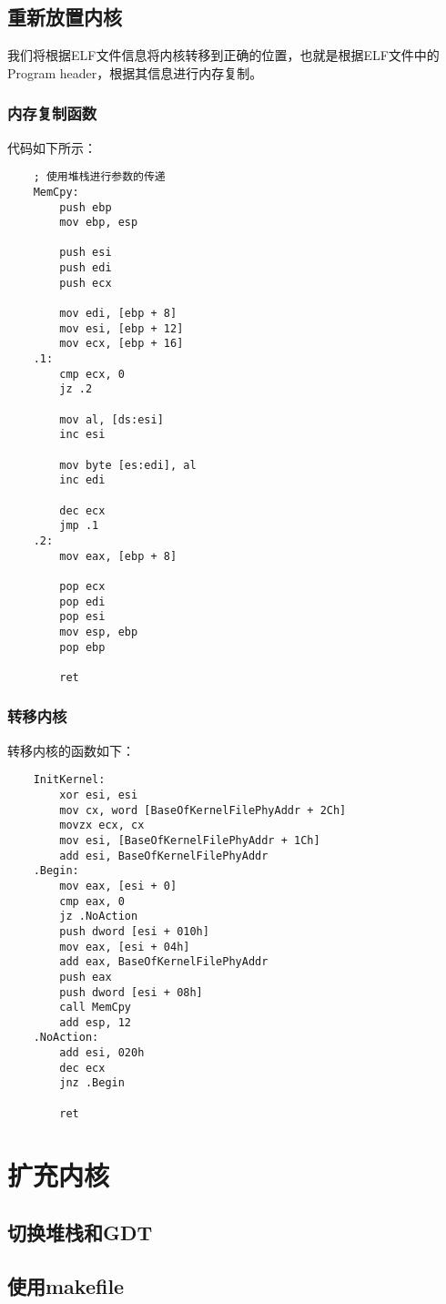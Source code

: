 \documentclass[a4paper,left=2.5cm,right=2.5cm,11pt]{article}
\begin{document}
\subsection{重新放置内核}
	我们将根据ELF文件信息将内核转移到正确的位置，也就是根据ELF文件中的Program header，根据其信息进行内存复制。
	
\subsubsection{内存复制函数}
	代码如下所示：
	\begin{lstlisting}
	; 使用堆栈进行参数的传递
	MemCpy:
		push ebp
		mov ebp, esp

		push esi
		push edi
		push ecx

		mov edi, [ebp + 8]
		mov esi, [ebp + 12]
		mov ecx, [ebp + 16]
	.1:
		cmp ecx, 0
		jz .2

		mov al, [ds:esi]
		inc esi

		mov byte [es:edi], al
		inc edi

		dec ecx
		jmp .1
	.2:
		mov eax, [ebp + 8]

		pop ecx
		pop edi
		pop esi
		mov esp, ebp
		pop ebp

		ret
	\end{lstlisting}

\subsubsection{转移内核}
	转移内核的函数如下：
	\begin{lstlisting}
	InitKernel:
		xor esi, esi
		mov cx, word [BaseOfKernelFilePhyAddr + 2Ch]
		movzx ecx, cx
		mov esi, [BaseOfKernelFilePhyAddr + 1Ch]
		add esi, BaseOfKernelFilePhyAddr
	.Begin:
		mov eax, [esi + 0]
		cmp eax, 0
		jz .NoAction
		push dword [esi + 010h]
		mov eax, [esi + 04h]
		add eax, BaseOfKernelFilePhyAddr
		push eax
		push dword [esi + 08h]
		call MemCpy
		add esp, 12
	.NoAction:
		add esi, 020h
		dec ecx
		jnz .Begin

		ret
	\end{lstlisting}

\section{扩充内核}
\subsection{切换堆栈和GDT}
\subsection{使用makefile}
\end{document}
